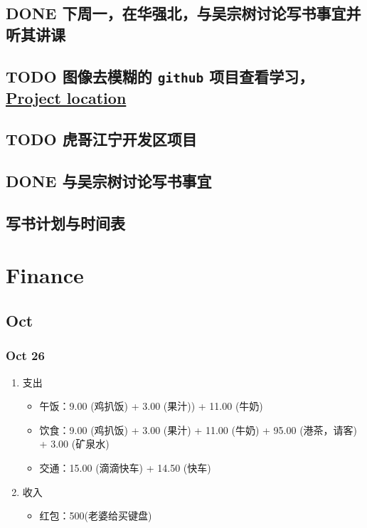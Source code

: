 \documentclass[11pt]{article}
\begin{document}
\subsection{{\bfseries\sffamily DONE} 下周一，在华强北，与吴宗树讨论写书事宜并听其讲课}
\label{sec:orgheadline20}
\subsection{{\bfseries\sffamily TODO} 图像去模糊的 \texttt{github} 项目查看学习，\href{https://github.com/alexjc/neural-enhance}{Project location}}
\label{sec:orgheadline21}
\subsection{{\bfseries\sffamily TODO} 虎哥江宁开发区项目}
\label{sec:orgheadline22}
\subsection{{\bfseries\sffamily DONE} 与吴宗树讨论写书事宜}
\label{sec:orgheadline23}
\subsection{写书计划与时间表}
\label{sec:orgheadline24}
\section{Finance}
\label{sec:orgheadline40}

\subsection{Oct}
\label{sec:orgheadline32}
\subsubsection{Oct 26}
\label{sec:orgheadline26}
\begin{enumerate}
\item 支出
\begin{itemize}
\item 午饭：9.00 (鸡扒饭) + 3.00 (果汁)) + 11.00 (牛奶)
\item 饮食：9.00 (鸡扒饭) + 3.00 (果汁) + 11.00 (牛奶) + 95.00 (港茶，请客) + 3.00 (矿泉水)
\item 交通：15.00 (滴滴快车) + 14.50 (快车)
\end{itemize}
\item 收入
\begin{itemize}
\item 红包：500(老婆给买键盘)
\end{itemize}
\end{enumerate}
\end{document}
